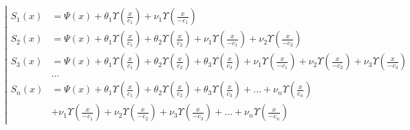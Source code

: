 \begin{equation*} \left| \begin{aligned}
S_1(x) &=
  \Psi(x)
+ \theta_1 \Upsilon{\left(\frac{x}{c_1} \right)}
+ \nu_1 \Upsilon{\left(\frac{x}{- c_1} \right)} \\
%
S_2(x) &=
  \Psi(x)
+ \theta_1 \Upsilon{\left(\frac{x}{c_1} \right)}
+ \theta_2 \Upsilon{\left(\frac{x}{c_2} \right)}
+ \nu_1 \Upsilon{\left(\frac{x}{- c_1} \right)}
+ \nu_2 \Upsilon{\left(\frac{x}{- c_2} \right)} \\
%
S_3(x) &=
  \Psi(x)
+ \theta_1 \Upsilon{\left(\frac{x}{c_1} \right)}
+ \theta_2 \Upsilon{\left(\frac{x}{c_2} \right)}
+ \theta_3 \Upsilon{\left(\frac{x}{c_3} \right)}
+ \nu_1 \Upsilon{\left(\frac{x}{- c_1} \right)}
+ \nu_2 \Upsilon{\left(\frac{x}{- c_2} \right)}
+ \nu_3 \Upsilon{\left(\frac{x}{- c_3} \right)} \\
%
&\ldots \\
%
S_n(x) &=
  \Psi(x)
+ \theta_1 \Upsilon{\left(\frac{x}{c_1} \right)}
+ \theta_2 \Upsilon{\left(\frac{x}{c_2} \right)}
+ \theta_3 \Upsilon{\left(\frac{x}{c_3} \right)}
+ \ldots
+ \nu_n \Upsilon{\left(\frac{x}{c_n} \right)} \\ &
+ \nu_1 \Upsilon{\left(\frac{x}{- c_1} \right)}
+ \nu_2 \Upsilon{\left(\frac{x}{- c_2} \right)}
+ \nu_3 \Upsilon{\left(\frac{x}{- c_3} \right)}
+ \ldots
+ \nu_n \Upsilon{\left(\frac{x}{- c_n} \right)}
\end{aligned} \right. \end{equation*}

